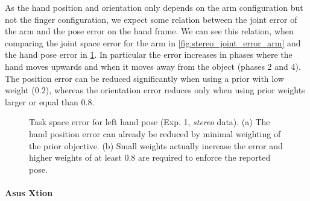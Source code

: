 As the hand position and orientation only depends on the arm configuration but not the finger configuration, we expect some relation between the joint error of the arm and the pose error on the hand frame. We can see this relation, when comparing the joint space error for the arm in \cref{fig:stereo_joint_error_arm} and the hand pose error in \cref{fig:stereo_hand_pose_error}. In particular the error increases in phases where the hand moves upwards and when it moves away from the object (phases 2 and 4). The position error can be reduced significantly when using a prior with low weight ($0.2$), whereas the orientation error reduces only when using prior weights larger or equal than $0.8$.

\begin{figure}[h]
\centering
{}
%
\caption[Task space error (Exp. 1, stereo)]{Task space error for left hand pose (Exp. 1, \textit{stereo} data). (a) The hand position error can already be reduced by minimal weighting of the prior objective. (b) Small weights actually increase the error and higher weights of at least $0.8$ are required to enforce the reported pose.}
\label{fig:stereo_hand_pose_error}
\end{figure}


\paragraph{Asus Xtion}

